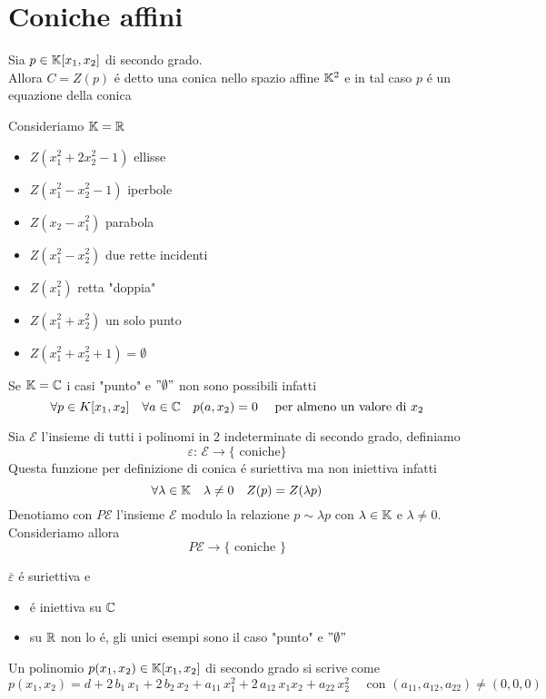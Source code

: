 %

%
\section{Coniche affini}

\begin{defn}[Conica]\bianco
 Sia $p\in \mathbb{K}[x_1,x_2]$ di secondo grado.\\
Allora  $C=Z(p) $ \'e detto una conica nello spazio affine $\mathbb{K}^2 $ e in tal caso  $p$ \'e un equazione della conica 
\end{defn}
\begin{ese}Consideriamo $\mathbb{K}=\mathbb{R}$
\begin{itemize}
\item $Z\left( x_1^2+2x_2^2 -1 \right)$ ellisse
\item $Z(x_1^2-x_2^2-1) $ iperbole
\item $Z(x_2-x_1^2)$ parabola
\item $Z(x_1^2-x_2^2)$ due rette incidenti
\item $Z(x_1^2)$ retta "doppia"
\item $Z(x_1^2+x_2^2)$ un solo punto
\item $Z(x_1^2+x_2^2+1) = \emptyset$
\end{itemize}
\begin{oss}Se $\mathbb{K}=\mathbb{C}$ i casi "punto" e $"\emptyset"$ non sono possibili infatti
$$ \forall p\in K[x_1, x_2] \quad \forall a \in \mathbb{C} \quad p(a, x_2)=0 \quad \text{ per almeno un valore di } x_2$$
\end{oss}
\end{ese}
Sia $\mathcal{E}$ l'insieme di tutti i polinomi in 2 indeterminate di secondo grado, definiamo 
$$ \varepsilon :\, \mathcal{E} \to \{ \text{ coniche} \}$$
Questa funzione per definizione di conica \'e suriettiva ma non iniettiva infatti
$$ \forall \lambda \in \mathbb{K} \quad \lambda\neq  0 \quad Z(p)= Z(\lambda p ) $$
Denotiamo  con $P \mathcal{E}$ l'insieme $\mathcal{E}$ modulo la relazione $p \sim \lambda p$ con $\lambda \in \mathbb{K} $ e $\lambda \neq 0 $.\\

Consideriamo allora 
$$ P \mathcal{E} \to \{ \text{ coniche }\} $$

\begin{prop} $\overline{\varepsilon}$ \'e suriettiva e 
\begin{itemize}
\item \'e iniettiva su $\mathbb{C}$
\item su $\mathbb{R}$ non lo \'e, gli unici esempi sono il caso "punto" e $"\emptyset"$
\end{itemize}
\end{prop}
\spazio
Un polinomio $p(x_1,x_2) \in \mathbb{K}[x_1, x_2] $ di secondo grado si scrive come
$$ p(x_1, x_2) = d +2\, b_1 \,x_1 +2\, b_2\,  x_2 + a_{11} \, x_1^2 + 2\,a_{12}\,x_1 x_2 + a_{22}\,x_2^2  \quad  \text{ con } 
 (a_{11},a_{12},a_{22} ) \neq (0,0,0)$$
 
